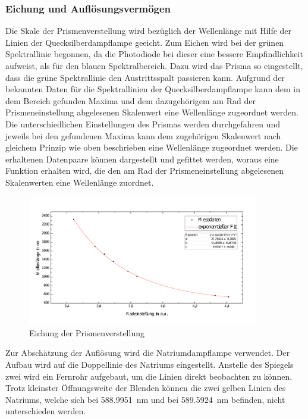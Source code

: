 \documentclass[a4paper,twoside,final]{article}
\begin{document}
\subsubsection{Eichung und Auflösungsvermögen}
Die Skale der Prismenverstellung wird bezüglich der Wellenlänge mit Hilfe der Linien der Quecksilberdampflampe geeicht. Zum Eichen wird bei der grünen Spektrallinie begonnen, da die Photodiode bei dieser eine bessere Empfindlichkeit aufweist, als für den blauen Spektralbereich. Dazu wird das Prisma so eingestellt, dass die grüne Spektrallinie den Austrittsspalt passieren kann. Aufgrund der bekannten Daten für die Spektrallinien der Quecksilberdampflampe kann dem in dem Bereich gefunden Maxima und dem dazugehörigem am Rad der Prismeneinstellung abgelesenen Skalenwert eine Wellenlänge zugeordnet werden. Die unterschiedlichen Einstellungen des Prismas werden durchgefahren und jeweils bei den gefundenen Maxima kann dem zugehörigen Skalenwert nach gleichem Prinzip wie oben beschrieben eine Wellenlänge zugeordnet werden. Die erhaltenen Datenpaare können dargestellt und gefittet werden, woraus eine Funktion erhalten wird, die den am Rad der Prismeneinstellung abgelesenen Skalenwerten eine Wellenlänge zuordnet.
\begin{figure}[htp]
    \centering
        \includegraphics[width=0.9\textwidth]{Bilder/Eichung_SPM1_mitQuecksilberdapflampe.pdf}
    \caption{Eichung der Prismenverstellung}
    \label{fig:EichungSPM1}
\end{figure}

Zur Abschätzung der Auflösung wird die Natriumdampflampe verwendet. Der Aufbau wird auf die Doppellinie des Natriums eingestellt. Anstelle des Spiegels zwei wird ein Fernrohr aufgebaut, um die Linien direkt beobachten zu können. Trotz kleinster Öffnungsweite der Blenden können die zwei gelben Linien des Natriums, welche sich bei \SI{588.9951}{\nano\meter} und bei \SI{589.5924}{\nano\meter} befinden, nicht unterschieden werden.
\end{document}
